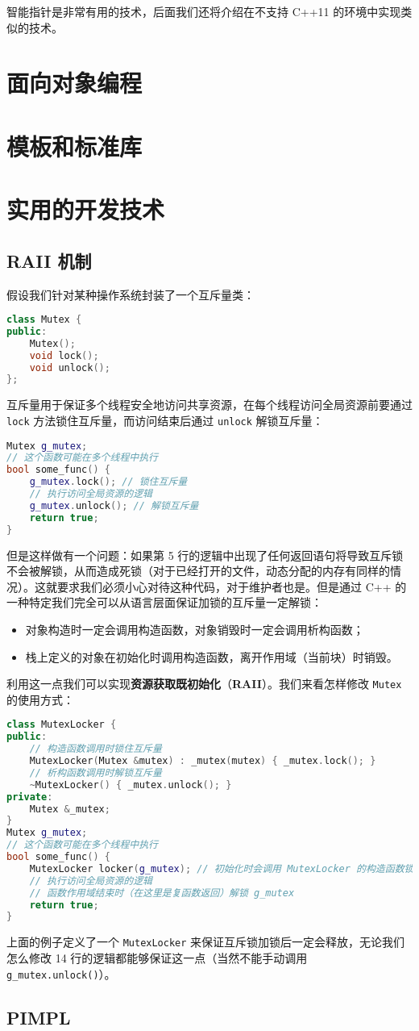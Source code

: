 \documentclass[hyperref,UTF8]{article}
\begin{document}
智能指针是非常有用的技术，后面我们还将介绍在不支持 C++11 的环境中实现类似的技术。

\section{面向对象编程}

\section{模板和标准库}

\section{实用的开发技术}

\subsection{RAII 机制}

假设我们针对某种操作系统封装了一个互斥量类：
\begin{lstlisting}[language=c++]
class Mutex {
public:
    Mutex();
    void lock();
    void unlock();
};
\end{lstlisting}
互斥量用于保证多个线程安全地访问共享资源，在每个线程访问全局资源前要通过 \texttt{lock} 方法锁住互斥量，而访问结束后通过 \texttt{unlock} 解锁互斥量：
\begin{lstlisting}[language=c++]
Mutex g_mutex;
// 这个函数可能在多个线程中执行
bool some_func() {
    g_mutex.lock(); // 锁住互斥量
    // 执行访问全局资源的逻辑
    g_mutex.unlock(); // 解锁互斥量
    return true;
}
\end{lstlisting}
但是这样做有一个问题：如果第 5 行的逻辑中出现了任何返回语句将导致互斥锁不会被解锁，从而造成死锁（对于已经打开的文件，动态分配的内存有同样的情况）。这就要求我们必须小心对待这种代码，对于维护者也是。但是通过 C++ 的一种特定我们完全可以从语言层面保证加锁的互斥量一定解锁：
\begin{itemize}
  \item 对象构造时一定会调用构造函数，对象销毁时一定会调用析构函数；
  \item 栈上定义的对象在初始化时调用构造函数，离开作用域（当前块）时销毁。
\end{itemize}
利用这一点我们可以实现\textbf{资源获取既初始化}（\textbf{RAII}）。我们来看怎样修改 \texttt{Mutex} 的使用方式：
\begin{lstlisting}[language=c++]
class MutexLocker {
public:
    // 构造函数调用时锁住互斥量
    MutexLocker(Mutex &mutex) : _mutex(mutex) { _mutex.lock(); }
    // 析构函数调用时解锁互斥量
    ~MutexLocker() { _mutex.unlock(); }
private:
    Mutex &_mutex;
}
Mutex g_mutex;
// 这个函数可能在多个线程中执行
bool some_func() {
    MutexLocker locker(g_mutex); // 初始化时会调用 MutexLocker 的构造函数锁住 g_mutex
    // 执行访问全局资源的逻辑
    // 函数作用域结束时（在这里是复函数返回）解锁 g_mutex
    return true;
}
\end{lstlisting}
上面的例子定义了一个 \texttt{MutexLocker} 来保证互斥锁加锁后一定会释放，无论我们怎么修改 14 行的逻辑都能够保证这一点（当然不能手动调用 \texttt{g\_mutex.unlock()}）。

\subsection{PIMPL}


\end{document}
